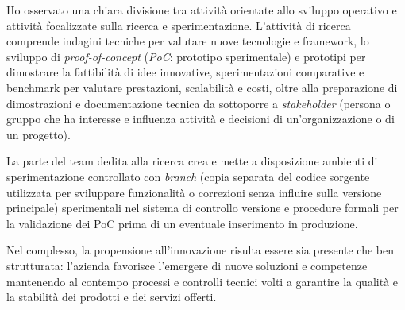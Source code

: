 Ho osservato una chiara divisione tra attività orientate allo sviluppo operativo e attività focalizzate sulla ricerca e sperimentazione. 
L'attività di ricerca comprende indagini tecniche per valutare nuove tecnologie e framework, lo sviluppo di \emph{proof-of-concept} (\emph{PoC}: prototipo sperimentale) e 
prototipi per dimostrare la fattibilità di idee innovative, sperimentazioni comparative e benchmark per valutare prestazioni, scalabilità e costi, oltre alla preparazione di dimostrazioni e 
documentazione tecnica da sottoporre a \emph{stakeholder} (persona o gruppo che ha interesse e influenza attività e decisioni di un'organizzazione o di un progetto).

La parte del team dedita alla ricerca crea e mette a disposizione ambienti di sperimentazione controllato con 
\emph{branch} (copia separata del codice sorgente utilizzata per sviluppare funzionalità o correzioni senza influire sulla versione principale) sperimentali nel sistema di controllo versione e procedure formali per la validazione dei PoC prima di un eventuale inserimento in produzione. 

Nel complesso, la propensione all'innovazione risulta essere sia presente che ben strutturata: l'azienda favorisce l'emergere di nuove soluzioni e competenze mantenendo al contempo processi e controlli tecnici volti a 
garantire la qualità e la stabilità dei prodotti e dei servizi offerti.